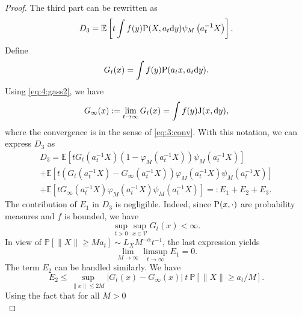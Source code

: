 \documentclass[preprint,12pt]{elsarticle}
\theoremstyle{definition}
\theoremstyle{remark}
\newcommand{\bfx}{{ x}}
\newcommand{\xbf}{{ x}}
\newcommand{\Xbf}{{ X}}
\newcommand{\bfy}{{ y}}
\newcommand{\1}{{\mathbf 1}}
\renewcommand{\P}{\mathbb{P}}
\numberwithin{equation}{section}
\newcommand{\Ebb}{\mathbb{E}}  %
\newcommand{\Pbb}{\mathbb{P}}
\newcommand{\ud}{{\rm d}}
\newcommand{\Prm}{{\rm P}}
\newcommand{\Krm}{{\rm J}}
\newcommand{\Vcal}{\mathcal{V}}
\begin{document}
\begin{proof}
    The third part can be rewritten as  
    \begin{equation*}  
      D_3 = \Ebb\left[t \int f(\bfy) \Prm(\Xbf, a_t \ud \bfy) 
      \psi_M\left(a_t^{-1} \Xbf \right)\right].  
    \end{equation*}  
    Define  
    \begin{equation*}  
      G_t(\bfx) = \int f(\bfy) \Prm(a_t \bfx, a_t \ud \bfy).  
    \end{equation*}  
    Using \eqref{eq:4:gass2}, we have  
    \begin{equation*}  
      G_\infty(\bfx) := \lim_{t \to \infty} G_t(\bfx) = \int f(\bfy) \Krm(\bfx,\ud \bfy),  
    \end{equation*}  
    where the convergence is in the sense of \eqref{eq:3:conv}.
    With this notation, we can express \(D_3\) as  
    \begin{multline*}  
      D_3 =  
      \Ebb\left[t G_t\left(a_t^{-1} \Xbf\right) \left(1 - \varphi_M(a_t^{-1} \Xbf)\right) 
      \psi_M(a_t^{-1} \Xbf)\right] \\  
      + 
      \Ebb\left[t \left(G_t\left(a_t^{-1} \Xbf\right) - G_\infty\left(a_t^{-1} \Xbf\right)\right)  
      \varphi_M\left(a_t^{-1} \Xbf\right) \psi_M\left(a_t^{-1} \Xbf\right)\right] \\  
      + 
      \Ebb\left[t G_\infty\left(a_t^{-1} \Xbf\right) 
      \varphi_M\left(a_t^{-1} \Xbf\right) \psi_M\left(a_t^{-1} \Xbf\right)\right] 
      =: E_1 + E_2 + E_3.  
    \end{multline*}  
    The contribution of \( E_1 \) in \( D_3 \) is negligible. 
    Indeed, since \(\Prm(x, \cdot)\) are probability measures and \( f \) is bounded, we have  
    \begin{equation*}  
      \sup_{t > 0} \sup_{\bfx \in \Vcal} G_t(\bfx) < \infty.  
    \end{equation*}  
    In view of \(\Pbb[\|\Xbf\| \ge M a_t] \sim L_\Xbf M^{-\alpha} t^{-1}\), the last expression yields  
    \begin{equation*}  
      \lim_{M \to \infty} \limsup_{t \to \infty} E_1 = 0.  
    \end{equation*}  
    The term $E_2$ can be handled similarly. 
    We have
    \begin{equation*}
      E_2 \le \sup_{\|\xbf\| \le 2M} \left|G_t(\xbf) - G_\infty (\xbf)\right| \:  
      t \: \P[\|\Xbf\| \ge a_t/ M].
    \end{equation*}
    Using the fact that for all $M>0$
    \begin{equation*}  

\end{equation*}
\end{proof}
\end{document}
